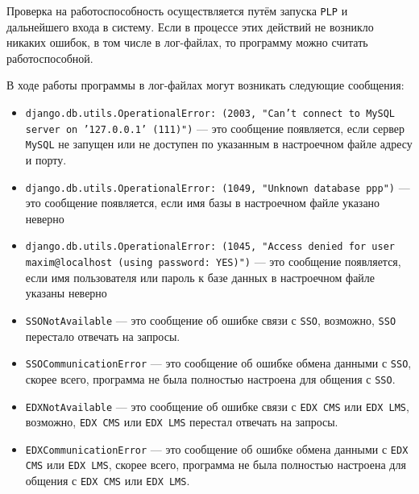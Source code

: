 Проверка на работоспособность осуществляется путём запуска \texttt{PLP} и дальнейшего входа
в систему. Если в процессе этих действий не возникло никаких ошибок, в том числе в лог-файлах,
то программу можно считать работоспособной.

В ходе работы программы в лог-файлах могут возникать следующие сообщения:
\begin{itemize}
	\item \texttt{django.db.utils.OperationalError: (2003, "Can't connect to MySQL server on '127.0.0.1' (111)")} ---
		это сообщение появляется, если сервер \texttt{MySQL} не запущен или не доступен по указанным в настроечном файле адресу и порту.
	\item \texttt{django.db.utils.OperationalError: (1049, "Unknown database \textquotesingle{}ppp\textquotesingle{}")} --- это сообщение
		появляется, если имя базы в настроечном файле указано неверно
	\item \texttt{django.db.utils.OperationalError: (1045, "Access denied for user \textquotesingle{}maxim\textquotesingle{}@\textquotesingle{}localhost\textquotesingle{} (using password: YES)")} ---
		это сообщение появляется, если имя пользователя или пароль к базе данных в настроечном файле указаны неверно
	\item \texttt{SSONotAvailable} --- это сообщение об ошибке связи с \texttt{SSO}, возможно,
		\texttt{SSO} перестало отвечать на запросы.
	\item \texttt{SSOCommunicationError} --- это сообщение об ошибке обмена данными с \texttt{SSO},
		скорее всего, программа не была полностью настроена для общения с \texttt{SSO}.
	\item \texttt{EDXNotAvailable} --- это сообщение об ошибке связи с \texttt{EDX CMS} или \texttt{EDX LMS},
		возможно, \texttt{EDX CMS} или \texttt{EDX LMS} перестал отвечать на запросы.
	\item \texttt{EDXCommunicationError} --- это сообщение об ошибке обмена данными
		с \texttt{EDX CMS} или \texttt{EDX LMS}, скорее всего,
		программа не была полностью настроена для общения с \texttt{EDX CMS} или \texttt{EDX LMS}.
\end{itemize}
